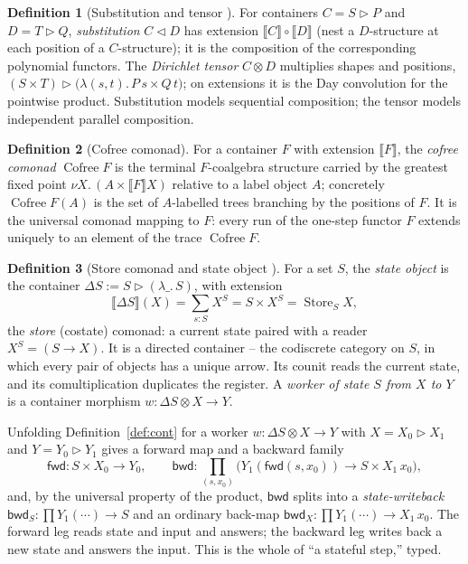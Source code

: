 \documentclass[11pt]{amsart}
\newcommand{\ctr}{\mathbin{\triangleright}}      %
\newcommand{\ext}[1]{\llbracket #1 \rrbracket}    %
\newcommand{\comp}{\mathbin{\triangleleft}}       %
\newcommand{\fwd}{\mathsf{fwd}}
\newcommand{\bwd}{\mathsf{bwd}}
\DeclareMathOperator{\Store}{Store}
\DeclareMathOperator{\cofree}{Cofree}
\theoremstyle{plain}
\theoremstyle{definition}
\newtheorem{definition}{Definition}
\theoremstyle{remark}
\begin{document}
\begin{definition}[Substitution and tensor \cite{spivakref,niuspivak}]\label{def:comp}
For containers $C=S\ctr P$ and $D=T\ctr Q$, \emph{substitution} $C\comp D$ has extension
$\ext C\circ\ext D$ (nest a $D$-structure at each position of a $C$-structure); it is the composition
of the corresponding polynomial functors. The \emph{Dirichlet tensor} $C\otimes D$ multiplies shapes
and positions, $(S\times T)\ctr\big(\lambda(s,t).\,P\,s\times Q\,t\big)$; on extensions it is the
Day convolution for the pointwise product. Substitution models sequential composition; the tensor
models independent parallel composition.
\end{definition}

\begin{definition}[Cofree comonad]\label{def:cofree}
For a container $F$ with extension $\ext F$, the \emph{cofree comonad} $\cofree F$ is the terminal
$F$-coalgebra structure carried by the greatest fixed point $\nu X.\,(A\times\ext F X)$ relative to a
label object $A$; concretely $\cofree F(A)$ is the set of $A$-labelled trees branching by the
positions of $F$. It is the universal comonad mapping to $F$: every run of the one-step functor $F$
extends uniquely to an element of the trace $\cofree F$.
\end{definition}

\begin{definition}[Store comonad and state object \cite{niuspivak}]\label{def:store}
For a set $S$, the \emph{state object} is the container $\Delta S:=S\ctr(\lambda\_.\,S)$, with
extension
\[
  \ext{\Delta S}(X)=\textstyle\sum_{s:S}X^{S}=S\times X^{S}=\Store_S X,
\]
the \emph{store} (costate) comonad: a current state paired with a reader $X^S=(S\to X)$. It is a
directed container -- the codiscrete category on $S$, in which every pair of objects has a unique
arrow. Its counit reads the current state, and its comultiplication duplicates the register. A
\emph{worker of state $S$ from $X$ to $Y$} is a container morphism $w:\Delta S\otimes X\to Y$.
\end{definition}

\noindent Unfolding Definition~\ref{def:cont} for a worker $w:\Delta S\otimes X\to Y$ with
$X=X_0\ctr X_1$ and $Y=Y_0\ctr Y_1$ gives a forward map and a backward family
\begin{equation}\label{eq:fwdbwd}
  \fwd:S\times X_0\to Y_0,
  \qquad
  \bwd:\textstyle\prod_{(s,x_0)}\big(Y_1(\fwd(s,x_0))\to S\times X_1\,x_0\big),
\end{equation}
and, by the universal property of the product, $\bwd$ splits into a \emph{state-writeback}
$\bwd_S:\prod Y_1(\cdots)\to S$ and an ordinary back-map $\bwd_X:\prod Y_1(\cdots)\to X_1\,x_0$. The
forward leg reads state and input and answers; the backward leg writes back a new state and answers
the input. This is the whole of ``a stateful step,'' typed.
\end{document}

